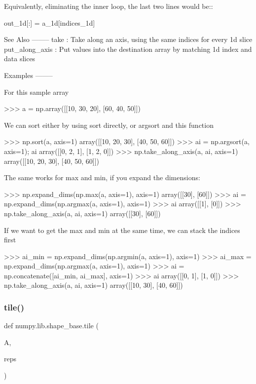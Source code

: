 \begin{DoxyVerb}
Equivalently, eliminating the inner loop, the last two lines would be::

            out_1d[:] = a_1d[indices_1d]

See Also
--------
take : Take along an axis, using the same indices for every 1d slice
put_along_axis :
    Put values into the destination array by matching 1d index and data slices

Examples
--------

For this sample array

>>> a = np.array([[10, 30, 20], [60, 40, 50]])

We can sort either by using sort directly, or argsort and this function

>>> np.sort(a, axis=1)
array([[10, 20, 30],
       [40, 50, 60]])
>>> ai = np.argsort(a, axis=1); ai
array([[0, 2, 1],
       [1, 2, 0]])
>>> np.take_along_axis(a, ai, axis=1)
array([[10, 20, 30],
       [40, 50, 60]])

The same works for max and min, if you expand the dimensions:

>>> np.expand_dims(np.max(a, axis=1), axis=1)
array([[30],
       [60]])
>>> ai = np.expand_dims(np.argmax(a, axis=1), axis=1)
>>> ai
array([[1],
       [0]])
>>> np.take_along_axis(a, ai, axis=1)
array([[30],
       [60]])

If we want to get the max and min at the same time, we can stack the
indices first

>>> ai_min = np.expand_dims(np.argmin(a, axis=1), axis=1)
>>> ai_max = np.expand_dims(np.argmax(a, axis=1), axis=1)
>>> ai = np.concatenate([ai_min, ai_max], axis=1)
>>> ai
array([[0, 1],
       [1, 0]])
>>> np.take_along_axis(a, ai, axis=1)
array([[10, 30],
       [40, 60]])
\end{DoxyVerb}
 \mbox{\label{namespacenumpy_1_1lib_1_1shape__base_a04f3685035c7fa6527780bab898b8a7f}} 
\subsubsection{\texorpdfstring{tile()}{tile()}}
{\footnotesize\ttfamily def numpy.\+lib.\+shape\+\_\+base.\+tile (\begin{DoxyParamCaption}\item[{}]{A,  }\item[{}]{reps }\end{DoxyParamCaption})}

